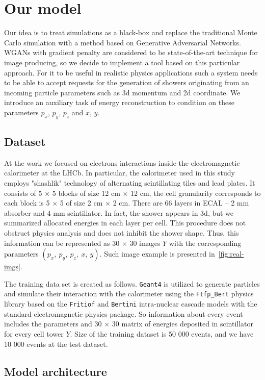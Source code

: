\documentclass{webofc}
\begin{document}
\section{Our model} \label{sec:model}
Our idea is to treat simulations as a black-box and replace the traditional Monte Carlo simulation with a method based on Generative Adversarial Networks. WGANs with gradient penalty are considered to be state-of-the-art technique for image producing, so we decide to implement a tool based on this particular approach. For it to be useful in realistic physics applications such a system needs to be able to accept requests for the generation of showers originating from an incoming particle parameters such as 3d momentum and 2d coordinate. We introduce an auxiliary task of energy reconstruction to condition on these parameters $p_x$, $p_y$, $p_z$ and $x$, $y$.

\subsection{Dataset}
At the work we focused on electrons interactions inside the electromagnetic calorimeter at the LHCb. In particular, the calorimeter used in this study employs "shashlik" technology of alternating scintillating tiles and lead plates. It consists of 5 $\times$ 5 blocks of size 12 cm $\times$ 12 cm, the cell granularity corresponds to each block is 5 $\times$ 5 of size 2 cm $\times$ 2 cm. There are 66 layers in ECAL -- 2 mm absorber and 4 mm scintillator. In fact, the shower appears in 3d, but we summarized allocated energies in each layer per cell. This procedure does not obstruct physics analysis and does not inhibit the shower shape. Thus, this information can be represented as 30 $\times$ 30 images $Y$ with the corresponding parameters $(p_x,~ p_y,~ p_z,~ x,~ y)$. Such image example is presented in~\cref{fig:real-imgs}.

The training data set is created as follows. \texttt{Geant4} is utilized to generate particles and simulate their interaction with the calorimeter using the \texttt{Ftfp\_Bert} physics library based on the \texttt{Fritiof}  and \texttt{Bertini} intra-nuclear cascade models with the standard electromagnetic physics package. So information about every event includes the parameters and 30 $\times$ 30 matrix of energies deposited in scintillator for every cell tower $Y$. Size of the training dataset is 50 000 events, and we have 10 000 events at the test dataset.

\subsection{Model architecture}
\end{document}

